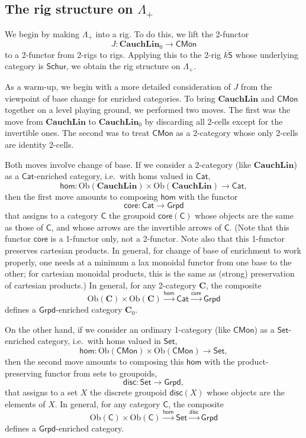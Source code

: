 \documentclass[12pt,reqno]{amsart}
\theoremstyle{plain}
\theoremstyle{definition}
\theoremstyle{remark}
\newcommand{\maps}{\colon}
\newcommand{\ob}{\mathrm{Ob}}
\newcommand{\core}{\mathsf{core}}
\newcommand{\disc}{\mathsf{disc}}
\renewcommand{\hom}{\mathsf{hom}}
\newcommand{\category}[1]{\mathsf{#1}}
\newcommand{\C}{\category C}
\renewcommand{\S}{\category S}
\newcommand{\namedcat}[1]{\mathsf{#1}}
\newcommand{\Cat}{\namedcat{Cat}}
\newcommand{\Grpd}{\namedcat{Grpd}}
\newcommand{\CMon}{\namedcat{CMon}}
\newcommand{\Set}{\namedcat{Set}}
\newcommand{\Schur}{\namedcat{Schur}}
\newcommand{\namedbicat}[1]{\mathbf{#1}}
\newcommand{\Lin}{\namedbicat{Lin}}
\newcommand{\Cauch}{\namedbicat{Cauch}}
\newcommand{\bC}{\namedbicat{C}}
\newcommand{\ksbar}{\overline{k\S}}
\numberwithin{thm}{section}
\begin{document}
\subsection{The rig structure on $\Lambda_+$}

We begin by making $\Lambda_+$ into a rig. To do this, we lift the 2-functor
\[
    J \maps \Cauch\Lin_0 \to \CMon
\]
to a 2-functor from 2-rigs to rigs. Applying this to the 2-rig $\ksbar$ whose underlying category is $\Schur$, we obtain the rig structure on $\Lambda_+$.

As a warm-up, we begin with a more detailed consideration of $J$ from the viewpoint of base change for enriched categories. To bring $\Cauch\Lin$ and $\CMon$ together on a level playing ground, we performed two moves. The first was the move from $\Cauch\Lin$ to $\Cauch\Lin_0$ by discarding all 2-cells except for the invertible ones. The second was to treat $\CMon$ as a 2-category whose only 2-cells are identity 2-cells. 

Both moves involve change of base. If we consider a 2-category (like $\Cauch\Lin$) as a $\Cat$-enriched category, i.e.\ with homs valued in $\Cat$,
\[
\hom \maps  \ob(\Cauch\Lin) \times \ob(\Cauch\Lin) \to \Cat,
\]
then the first move amounts to composing $\hom$ with the functor 
\[
    \core \maps \Cat \to \Grpd
\]
that assigns to a category $\C$ the groupoid $\core(\C)$ whose objects are the same as those of $\C$, and whose arrows are the invertible arrows of $\C$. (Note that this functor $\core$ is a 1-functor only, not a 2-functor. Note also that this 1-functor preserves cartesian products. In general, for change of base of enrichment to work properly, one needs at a minimum a lax monoidal functor from one base to the other; for cartesian monoidal products, this is the same as (strong) preservation of cartesian products.) In general, for any 2-category $\bC$, the composite
\[
    \ob(\bC) \times \ob(\bC) \xrightarrow{\hom} \Cat \xrightarrow{\core} \Grpd
\]
defines a $\Grpd$-enriched category $\bC_0$. 

On the other hand, if we consider an ordinary 1-category (like $\CMon$) as a $\Set$-enriched category, i.e.\ with homs valued in $\Set$, 
\[
    \hom \maps \ob(\CMon) \times \ob(\CMon) \to \Set, 
\]
then the second move amounts to composing this $\hom$ with the product-preserving functor from sets to groupoids, 
\[
    \disc \maps \Set \to \Grpd,
\]
that assigns to a set $X$ the discrete groupoid $\disc(X)$ whose objects are the elements of $X$. In general, for any category $\C$, the composite
\[
    \ob(\C) \times \ob(\C) \xrightarrow{\hom} \Set \xrightarrow{\disc} \Grpd
\]
defines a $\Grpd$-enriched category.
\end{document}
